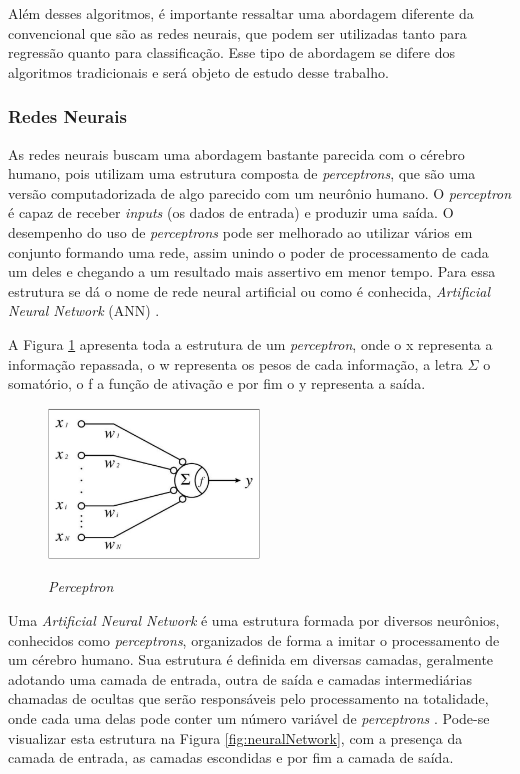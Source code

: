 Além desses algoritmos, é importante ressaltar uma abordagem diferente da convencional que são as redes neurais, que podem ser utilizadas tanto para regressão quanto para classificação. Esse tipo de abordagem se difere dos algoritmos tradicionais e será objeto de estudo desse trabalho.

\subsubsection{Redes Neurais}
\label{sec:redesneurais}

As redes neurais buscam uma abordagem bastante parecida com o cérebro humano, pois utilizam uma estrutura composta de \emph{perceptrons}, que são uma versão computadorizada de algo parecido com um neurônio humano. O \emph{perceptron} é capaz de receber \emph{inputs} (os dados de entrada) e produzir uma saída. O desempenho do uso de \emph{perceptrons} pode ser melhorado ao utilizar vários em conjunto formando uma rede, assim unindo o poder de processamento de cada um deles e chegando a um resultado mais assertivo em menor tempo. Para essa estrutura se dá o nome de rede neural artificial ou como é conhecida, \emph{Artificial Neural Network} (ANN) \cite{deepLearning, deepLearningTensorFlow}.

A Figura \ref{fig:perceptron} apresenta toda a estrutura de um \emph{perceptron}, onde o x representa a informação repassada, o w representa os pesos de cada informação, a letra $\Sigma$ o somatório, o f a função de ativação e por fim o y representa a saída.

\begin{figure}[!htb]
	\centering
	\caption{\emph{Perceptron}}
	\includegraphics[width=0.50\textwidth]{img/perceptron.jpg}
	\label{fig:perceptron}
\end{figure}

Uma \emph{Artificial Neural Network} é uma estrutura formada por diversos neurônios, conhecidos como \emph{perceptrons}, organizados de forma a imitar o processamento de um cérebro humano. Sua estrutura é definida em diversas camadas, geralmente adotando uma camada de entrada, outra de saída e camadas intermediárias chamadas de ocultas que serão responsáveis pelo processamento na totalidade, onde cada uma delas pode conter um número variável de \emph{perceptrons} \cite{deepLearningTensorFlow}. Pode-se visualizar esta estrutura na Figura \ref{fig:neuralNetwork}, com a presença da camada de entrada, as camadas escondidas e por fim a camada de saída.

